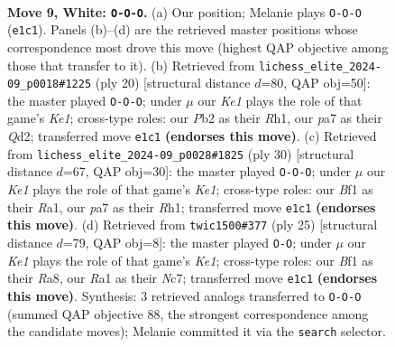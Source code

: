 \documentclass[11pt]{article}
\begin{document}
\begin{figure}[p]\centering
\begin{subfigure}{0.46\textwidth}\centering
\resizebox{\linewidth}{!}{%
\newchessgame
\chessboard[
  setfen={rnb1k2r/ppq1p1bp/3ppnp1/8/4P3/2N1BQ2/PPP2PPP/R3KB1R w KQkq - 2 9},
  showmover=false,
  pgfstyle=straightmove, color=movearrow, markmove={e1-c1}
]}
\caption{}
\end{subfigure}\hfill
\begin{subfigure}{0.46\textwidth}\centering
\resizebox{\linewidth}{!}{%
\newchessgame
\chessboard[
  setfen={r1b1k2r/1p2bppp/pq1ppn2/8/3NP3/1BN5/PPPQ1PPP/R3K2R w KQkq - 2 11},
  showmover=false,
  pgfstyle=straightmove, color=movearrow, markmove={e1-c1}
]}
\caption{}
\end{subfigure}
\\[4pt]
\begin{subfigure}{0.46\textwidth}\centering
\resizebox{\linewidth}{!}{%
\newchessgame
\chessboard[
  setfen={r1b1k2r/pp2q1b1/2pp3p/4np2/5BpP/1BN1PP2/PPP1Q1P1/R3K2R w KQkq - 2 16},
  showmover=false,
  pgfstyle=straightmove, color=movearrow, markmove={e1-c1}
]}
\caption{}
\end{subfigure}\hfill
\begin{subfigure}{0.46\textwidth}\centering
\resizebox{\linewidth}{!}{%
\newchessgame
\chessboard[
  setfen={r3k2r/ppn1bppp/2p1p3/5b2/2PPq3/4QN2/PP2BPPP/R1BR2K1 b kq - 2 13},
  showmover=false,
  pgfstyle=straightmove, color=movearrow, markmove={e8-g8}
]}
\caption{}
\end{subfigure}
\caption{\textbf{Move 9, White: \texttt{O-O-O}.} (a) Our position; Melanie plays \texttt{O-O-O} (\texttt{e1c1}). Panels (b)--(d) are the retrieved master positions whose correspondence most drove this move (highest QAP objective among those that transfer to it). (b) Retrieved from \texttt{lichess\_elite\_2024-09\_p0018\#1225} (ply 20) [structural distance $d$=80, QAP obj=50]: the master played \texttt{O-O-O}; under $\mu$ our \emph{Ke1} plays the role of that game's \emph{Ke1}; cross-type roles: our \emph{P}b2 as their \emph{R}h1, our \emph{p}a7 as their \emph{Q}d2; transferred move \texttt{e1c1} \textbf{(endorses this move)}. (c) Retrieved from \texttt{lichess\_elite\_2024-09\_p0028\#1825} (ply 30) [structural distance $d$=67, QAP obj=30]: the master played \texttt{O-O-O}; under $\mu$ our \emph{Ke1} plays the role of that game's \emph{Ke1}; cross-type roles: our \emph{B}f1 as their \emph{R}a1, our \emph{p}a7 as their \emph{R}h1; transferred move \texttt{e1c1} \textbf{(endorses this move)}. (d) Retrieved from \texttt{twic1500\#377} (ply 25) [structural distance $d$=79, QAP obj=8]: the master played \texttt{O-O}; under $\mu$ our \emph{Ke1} plays the role of that game's \emph{Ke1}; cross-type roles: our \emph{B}f1 as their \emph{R}a8, our \emph{R}a1 as their \emph{N}c7; transferred move \texttt{e1c1} \textbf{(endorses this move)}. Synthesis: 3 retrieved analogs transferred to \texttt{O-O-O} (summed QAP objective 88, the strongest correspondence among the candidate moves); Melanie committed it via the \texttt{search} selector.}
\label{fig:thought-m16}
\end{figure}
\end{document}
